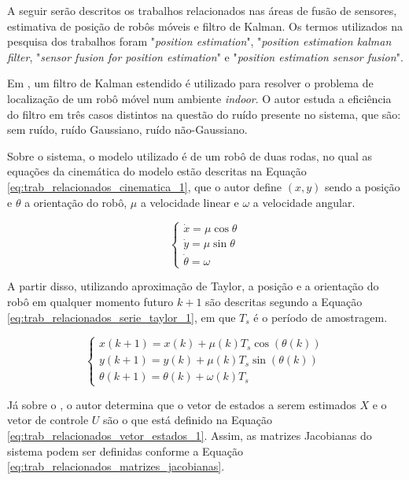 \documentclass[acronym, symbols, table]{fei}
\begin{document}
	A seguir serão descritos os trabalhos relacionados nas áreas de fusão de sensores, estimativa de posição de robôs móveis e filtro de Kalman. Os termos utilizados na pesquisa dos trabalhos foram "\textit{position estimation}", "\textit{position estimation kalman filter}, "\textit{sensor fusion for position estimation}" e "\textit{position estimation sensor fusion}".
	
	Em \textcite{eman2020mobile}, um filtro de Kalman estendido é utilizado para resolver o problema de localização de um robô móvel num ambiente \textit{indoor}. O autor estuda a eficiência do filtro em três casos distintos na questão do ruído presente no sistema, que são: sem ruído, ruído Gaussiano, ruído não-Gaussiano.
	
	Sobre o sistema, o modelo utilizado é de um robô de duas rodas, no qual as equações da cinemática do modelo estão descritas na Equação \eqref{eq:trab_relacionados_cinematica_1}, que o autor define $(x, y)$ sendo a posição e $\theta$ a orientação do robô, $\mu$ a velocidade linear e $\omega$ a velocidade angular.
	
	\begin{equation}\label{eq:trab_relacionados_cinematica_1}
		\begin{cases}
			\dot{x} = \mu \cos{\theta} \\
			\dot{y} = \mu \sin{\theta} \\
			\dot{\theta} = \omega
		\end{cases}
	\end{equation}
	
	A partir disso, utilizando aproximação de Taylor, a posição e a orientação do robô em qualquer momento futuro $k + 1$ são descritas segundo a Equação \eqref{eq:trab_relacionados_serie_taylor_1}, em que $T_s$ é o período de amostragem.
	
	\begin{equation} \label{eq:trab_relacionados_serie_taylor_1}
		\begin{cases*}
			x(k+1) = x(k) + \mu(k)T_s\cos{(\theta(k))} \\
			y(k+1) = y(k) + \mu(k)T_s\sin{(\theta(k))} \\
			\theta(k+1) = \theta(k) + \omega(k)T_s
		\end{cases*}
	\end{equation}
	
	Já sobre o , o autor determina que o vetor de estados a serem estimados $X$ e o vetor de controle $U$ são o que está definido na Equação \eqref{eq:trab_relacionados_vetor_estados_1}. Assim, as matrizes Jacobianas do sistema podem ser definidas conforme a Equação \eqref{eq:trab_relacionados_matrizes_jacobianas}.
	
\end{document}
